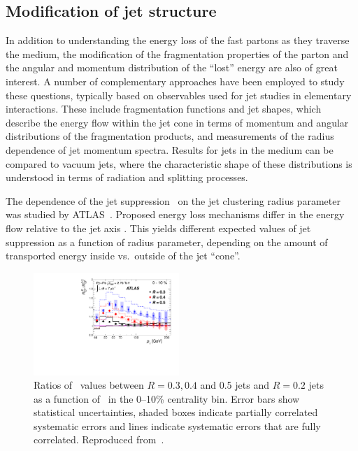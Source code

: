 \subsection{Modification of jet structure}


In addition to understanding the energy loss of the fast partons as they traverse 
the medium, the modification of the fragmentation properties of the parton and 
the angular and momentum distribution of the ``lost'' energy are also of great interest.
A number of complementary approaches have been employed to study these questions,
typically based on observables used for jet studies in elementary interactions.
These include fragmentation functions and jet shapes, which describe the energy flow 
within the jet cone in terms of momentum and angular distributions 
of the fragmentation products, and measurements of the radius dependence
of jet momentum spectra.  Results for jets in the medium can
be compared to vacuum jets, where the characteristic shape of these
distributions is understood in terms of radiation and splitting 
processes.

The dependence of the jet suppression \Rcp\ on the jet clustering radius parameter 
was studied by ATLAS~\cite{Aad:2012is}. Proposed energy loss mechanisms differ 
in the energy flow relative to the jet axis \cite{Vitev:2008rz, Vitev:2009rd,
He:2011pd}. This yields different expected values of jet suppression as a 
function of radius parameter, depending on the amount of transported energy 
inside vs.\ outside of the jet ``cone''.
\begin{figure}[!th]
\begin{center}
\includegraphics[width=0.49\textwidth]{jetfigures/ATLAS_jetRCP_size.pdf}
\caption{
Ratios of \Rcp\ values between $R = 0.3, 0.4$ and 0.5 jets and $R =
0.2$ jets as a function of \pT\ in the 0--10\% centrality bin.
Error bars show statistical uncertainties, shaded boxes
indicate partially correlated systematic errors and lines indicate
systematic errors that are fully correlated.
Reproduced from~\cite{Aad:2012is}.
}
\label{fig:GR:ATLAS_jetRCP_size}
\end{center}
\end{figure}


